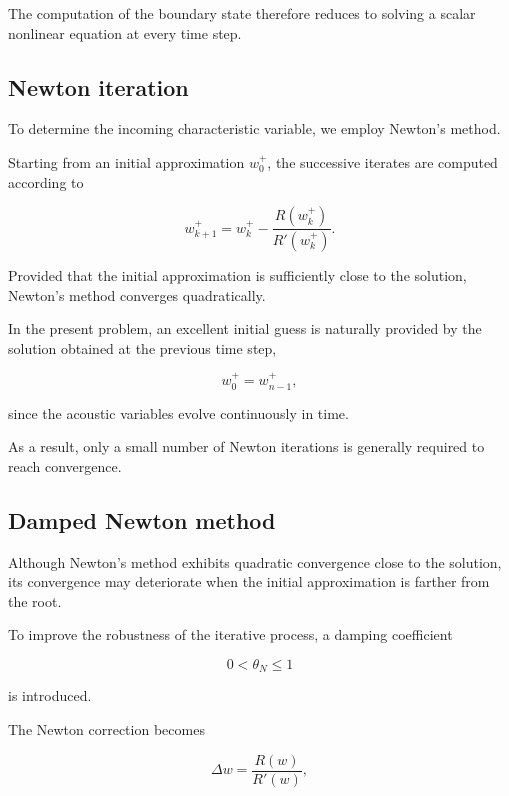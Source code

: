 \documentclass[11pt,a4paper]{report}
\theoremstyle{plain}
\theoremstyle{definition}
\begin{document}
The computation of the boundary state therefore reduces to solving a scalar
nonlinear equation at every time step.


\subsection{Newton iteration}

To determine the incoming characteristic variable, we employ Newton's method.

Starting from an initial approximation
\(w_0^+\),
the successive iterates are computed according to

\begin{equation}
w_{k+1}^+
=
w_k^+
-
\frac{R(w_k^+)}
{R'(w_k^+)}.
\end{equation}

Provided that the initial approximation is sufficiently close to the solution,
Newton's method converges quadratically.

In the present problem, an excellent initial guess is naturally provided by the
solution obtained at the previous time step,

\begin{equation}
w_0^+
=
w_{n-1}^+,
\end{equation}

since the acoustic variables evolve continuously in time.

As a result, only a small number of Newton iterations is generally required to
reach convergence.


\subsection{Damped Newton method}

Although Newton's method exhibits quadratic convergence close to the solution,
its convergence may deteriorate when the initial approximation is farther from
the root.

To improve the robustness of the iterative process, a damping coefficient

\[
0<\theta_N\le1
\]

is introduced.

The Newton correction becomes

\begin{equation}
\Delta w
=
\frac{R(w)}
{R'(w)},
\end{equation}
\end{document}
